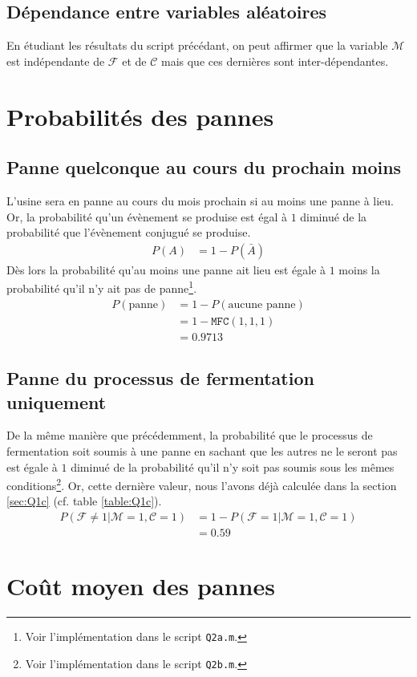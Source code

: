 \documentclass[a4paper, 12pt]{article}
\newcommand{\M}{\mathcal{M}}
\newcommand{\F}{\mathcal{F}}
\newcommand{\C}{\mathcal{C}}
\begin{document}
\subsection{Dépendance entre variables aléatoires}
En étudiant les résultats du script précédant, on peut affirmer que la variable	$\M$ est indépendante de $\F$ et de $\C$ mais que ces dernières sont inter-dépendantes.
\newpage
\section{Probabilités des pannes}
\subsection{Panne quelconque au cours du prochain moins}
L'usine sera en panne au cours du mois prochain si au moins une panne à lieu. Or, la probabilité qu'un évènement se produise est égal à $1$ diminué de la probabilité que l'évènement conjugué se produise.
\begin{align}
	P(A) & = 1 - P(\bar{A})
\end{align}
Dès lors la probabilité qu'au moins une panne ait lieu est égale à $1$ moins la probabilité qu'il n'y ait pas de panne\footnote{Voir l'implémentation dans le script \texttt{Q2a.m}.}.
\begin{align*}
	P(\textrm{panne}) & = 1 - P(\textrm{aucune panne}) \\
	                  & = 1 - \texttt{MFC}(1,1,1)   \\
	                  & = \num{0.9713}
\end{align*}
\subsection{Panne du processus de fermentation uniquement}
De la même manière que précédemment, la probabilité que le processus de fermentation soit soumis à une panne en sachant que les autres ne le seront pas est égale à $1$ diminué de la probabilité qu'il n'y soit pas soumis sous les mêmes conditions\footnote{Voir l'implémentation dans le script \texttt{Q2b.m}.}. Or, cette dernière valeur, nous l'avons déjà calculée dans la section \ref{sec:Q1c} (cf. table \ref{table:Q1c}).
\begin{align*}
	P(\F \neq 1|\M = 1, \C = 1) & = 1 - P(\F = 1|\M = 1, \C = 1) \\
	                            & = \num{0.59}
\end{align*}
\newpage
\section{Coût moyen des pannes}
\end{document}
